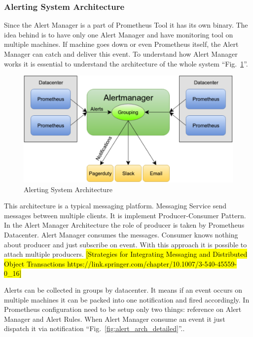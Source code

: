 \subsubsection{Alerting System Architecture}\label{Alerting System Architecture}

Since the Alert Manager is a part of Prometheus Tool it has its own binary. The idea behind is to have only one Alert Manager and have monitoring tool on multiple machines. If machine goes down or even Prometheus itself, the Alert Manager can catch and deliver this event. 
To understand how Alert Manager works it is essential to understand the architecture of the whole system ``Fig.~\ref{fig:alert_arch}''.

\begin{figure}[htbp]
\begin{center}
  \includegraphics[width=\linewidth]{components/3/alert_arch.png}
  \caption{Alerting System Architecture}
  \label{fig:alert_arch}
\end{center}
\end{figure}

This architecture is a typical messaging platform. 
Messaging Service send messages between multiple clients. It is implement Producer-Consumer Pattern. In the Alert Manager Architecture the role of producer is taken by Prometheus Datacenter. Alert Manager consumes the messages. Consumer knows nothing about producer and just subscribe on event. With this approach it is possible to attach multiple producers. \hl{[Strategies for Integrating Messaging and Distributed Object Transactions https://link.springer.com/chapter/10.1007/3-540-45559-0\_16]}

Alerts can be collected in groups by datacenter. It means if an event occurs on multiple machines it can be packed into one notification and fired accordingly. 
In Prometheus configuration need to be setup only two things: reference on Alert Manager and Alert Rules. When Alert Manager consume an event it just dispatch it via notification ``Fig.~\ref{fig:alert_arch_detailed}''.. 

